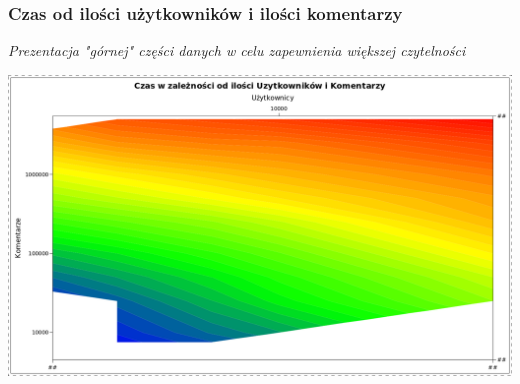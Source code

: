 \documentclass[11pt]{article}
\newcommand{\+}{\discretionary{\mbox{\scriptsize$\hookleftarrow$}}{}{}}
\begin{document}
\subsubsection{Czas od ilości użytkowników i ilości komentarzy}
\textsl{Prezentacja "górnej" części danych w celu zapewnienia większej czytelności}\\
\begin{centering}
	\includegraphics[width=\textwidth]{Wykres3}
\end{centering}
\end{document}
